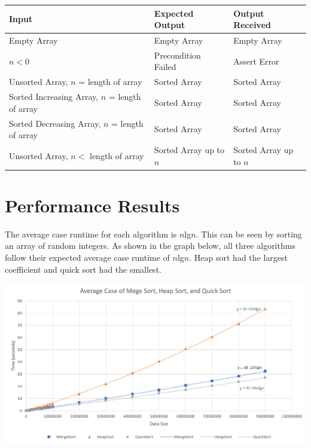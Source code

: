 \documentclass[a4paper]{article}
\begin{document}
    \begin{tabular}{ |l|l|l| }
        \hline
        \textbf{Input} & \textbf{Expected Output} & \textbf{Output Received} \\ \hline
        Empty Array & Empty Array & Empty Array \\ \hline
        $n < 0$ & Precondition Failed & Assert Error \\ \hline
        Unsorted Array, $n$ = length of array & Sorted Array & Sorted Array \\ \hline
        Sorted Increasing Array, $n$ = length of array & Sorted Array & Sorted Array \\ \hline
        Sorted Decreasing Array, $n$ = length of array & Sorted Array & Sorted Array \\ \hline
        Unsorted Array, $n <$ length of array & Sorted Array up to $n$ & Sorted Array up to $n$ \\ \hline
    \end{tabular}

    \section{Performance Results}
    The average case runtime for each algorithm is $n$lg$n$. This can be seen by 
    sorting an array of random integers. As shown in the graph below, all three 
    algorithms follow their expected average case runtime of $n$lg$n$. Heap sort 
    had the largest coefficient and quick sort had the smallest.\\
    \begin{center}
        \includegraphics[scale=0.65]{Average}
    \end{center}
\end{document}
